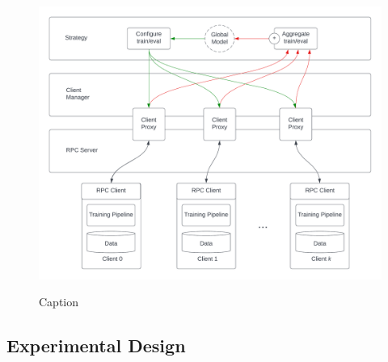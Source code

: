 \documentclass[letterpaper]{article} %
\begin{document}
\begin{figure}[h]
{\includegraphics[width=\columnwidth]{High Level Architecture}}
\caption{Caption}
\end{figure}

\subsection{Experimental Design}
\end{document}
